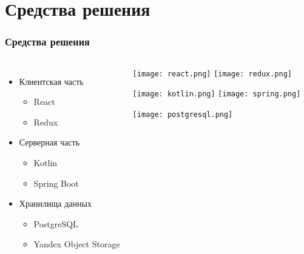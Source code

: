 \documentclass[12pt]{beamer}
\begin{document}
    \section{Средства решения}
    \begin{frame}
        \frametitle{Средства решения}

        \vspace{-1cm}

        \begin{columns}

            \begin{itemize}
                \item Клиентская часть
                \begin{itemize}
                    \item React
                    \item Redux
                \end{itemize}
                \item Серверная часть
                \begin{itemize}
                    \item Kotlin
                    \item Spring Boot
                \end{itemize}
                \item Хранилища данных
                \begin{itemize}
                    \item PostgreSQL
                    \item Yandex Object Storage
                \end{itemize}
            \end{itemize}

            \begin{center}
                \texttt{[image: react.png]}
                \vspace{0.5cm}
                \texttt{[image: redux.png]}
                \vspace{0.5cm}
                
                \texttt{[image: kotlin.png]}
                \vspace{0.5cm}
                \texttt{[image: spring.png]}
                \vspace{0.5cm}
                
                \texttt{[image: postgresql.png]}
            \end{center}
            
        \end{columns}
        
    \end{frame}
\end{document}
